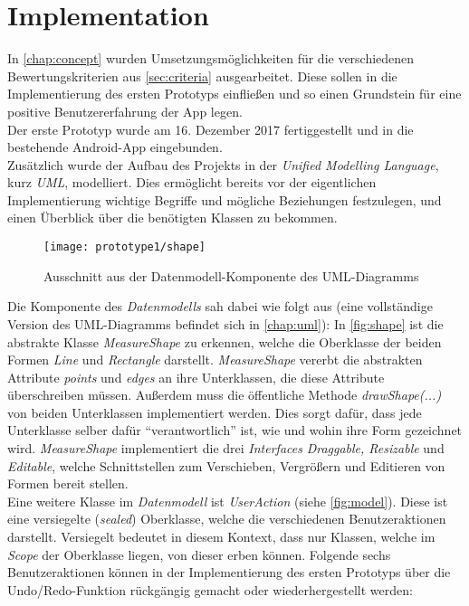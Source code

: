 \section{Implementation}\label{sec:pro1}
In \autoref{chap:concept} wurden Umsetzungsmöglichkeiten für die verschiedenen Bewertungskriterien aus \autoref{sec:criteria} ausgearbeitet.
Diese sollen in die Implementierung des ersten Prototyps einfließen und so einen Grundstein für eine positive Benutzererfahrung der App legen. \\

Der erste Prototyp wurde am 16. Dezember 2017 fertiggestellt und in die bestehende Android-App eingebunden. \\

\noindent
Zusätzlich wurde der Aufbau des Projekts in der \emph{Unified Modelling Language}, kurz \emph{UML}, modelliert.
Dies ermöglicht bereits vor der eigentlichen Implementierung wichtige Begriffe und mögliche Beziehungen festzulegen, und einen Überblick über die benötigten Klassen zu bekommen.

\begin{figure}[h]
  \centering
  \texttt{[image: prototype1/shape]}
  \caption{Ausschnitt aus der Datenmodell-Komponente des UML-Diagramms}
  \label{fig:shape}
\end{figure}

\noindent
Die Komponente des \emph{Datenmodells} sah dabei wie folgt aus (eine vollständige Version des UML-Diagramms befindet sich in \autoref{chap:uml}):
In \autoref{fig:shape} ist die abstrakte Klasse \emph{MeasureShape} zu erkennen, welche die Oberklasse der beiden Formen \emph{Line} und \emph{Rectangle} darstellt.
\emph{MeasureShape} vererbt die abstrakten Attribute \emph{points} und \emph{edges} an ihre Unterklassen, die diese Attribute überschreiben müssen.
Außerdem muss die öffentliche Methode \emph{drawShape(...)} von beiden Unterklassen implementiert werden.
Dies sorgt dafür, dass jede Unterklasse selber dafür ``verantwortlich'' ist, wie und wohin ihre Form gezeichnet wird.
\emph{MeasureShape} implementiert die drei \emph{Interfaces} \emph{Draggable, Resizable} und \emph{Editable}, welche Schnittstellen zum Verschieben, Vergrößern und Editieren von Formen bereit stellen. \\

\noindent
Eine weitere Klasse im \emph{Datenmodell} ist \emph{UserAction} (siehe \autoref{fig:model}).
Diese ist eine versiegelte (\emph{sealed}) Oberklasse, welche die verschiedenen Benutzeraktionen darstellt.
Versiegelt bedeutet in diesem Kontext, dass nur Klassen, welche im \emph{Scope} der Oberklasse liegen, von dieser erben können.
Folgende sechs Benutzeraktionen können in der Implementierung des ersten Prototyps über die Undo/Redo-Funktion rückgängig gemacht oder wiederhergestellt werden:

